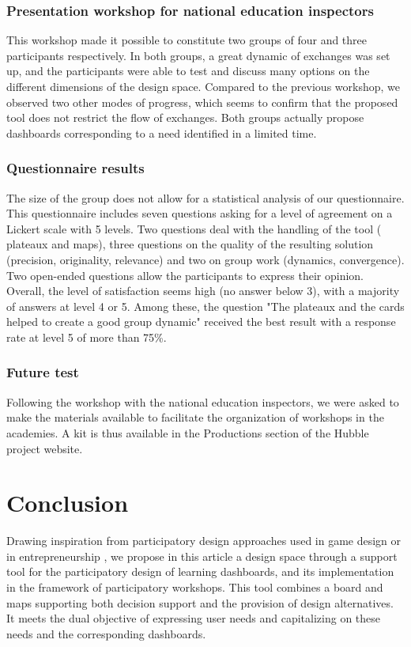 \documentclass[preprint,12pt]{elsarticle}
\begin{document}
\subsubsection{Presentation workshop for national education inspectors}
This workshop made it possible to constitute two groups of four and three participants respectively. In both groups, a great dynamic of exchanges was set up, and the participants were able to test and discuss many options on the different dimensions of the design space. Compared to the previous workshop, we observed two other modes of progress, which seems to confirm that the proposed tool does not restrict the flow of exchanges. Both groups actually propose dashboards corresponding to a need identified in a limited time. 

\subsubsection{Questionnaire results}
The size of the group does not allow for a statistical analysis of our questionnaire. This questionnaire includes seven questions asking for a level of agreement on a Lickert scale with 5 levels. Two questions deal with the handling of the tool ( plateaux and maps), three questions on the quality of the resulting solution (precision, originality, relevance) and two on group work (dynamics, convergence). Two open-ended questions allow the participants to express their opinion. Overall, the level of satisfaction seems high (no answer below 3), with a majority of answers at level 4 or 5. Among these, the question "The plateaux and the cards helped to create a good group dynamic" received the best result with a response rate at level 5 of more than 75\%.

\subsubsection{Future test}
Following the workshop with the national education inspectors, we were asked to make the materials available to facilitate the organization of workshops in the academies. A kit is thus available in the Productions section of the Hubble project website.




\section{Conclusion}
Drawing inspiration from participatory design approaches used in game design \cite{hallifax2018design} or in entrepreneurship \cite{osterwalder2010business}, we propose in this article a design space through a support tool for the participatory design of learning dashboards, and its implementation in the framework of participatory workshops. This tool combines a board and maps supporting both decision support and the provision of design alternatives. It meets the dual objective of expressing user needs and capitalizing on these needs and the corresponding dashboards. 
\end{document}
